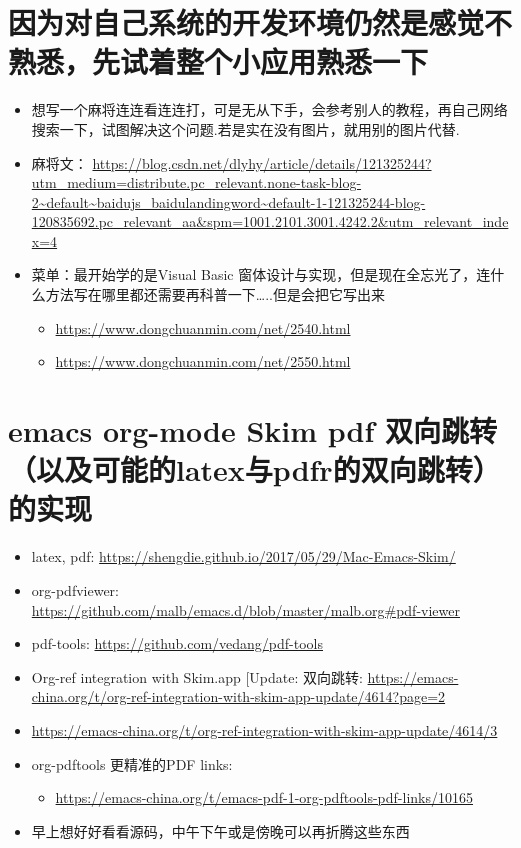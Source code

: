 \documentclass[9pt, b5paper]{article}
\begin{document}
\section{因为对自己系统的开发环境仍然是感觉不熟悉，先试着整个小应用熟悉一下}
\label{sec-9}
\begin{itemize}
\item 想写一个麻将连连看连连打，可是无从下手，会参考别人的教程，再自己网络搜索一下，试图解决这个问题.若是实在没有图片，就用别的图片代替.
\item 麻将文： \url{https://blog.csdn.net/dlyhy/article/details/121325244?utm_medium=distribute.pc_relevant.none-task-blog-2~default~baidujs_baidulandingword~default-1-121325244-blog-120835692.pc_relevant_aa&spm=1001.2101.3001.4242.2&utm_relevant_index=4}
\item 菜单：最开始学的是Visual Basic 窗体设计与实现，但是现在全忘光了，连什么方法写在哪里都还需要再科普一下\ldots{}..但是会把它写出来
\begin{itemize}
\item \url{https://www.dongchuanmin.com/net/2540.html}
\item \url{https://www.dongchuanmin.com/net/2550.html}
\end{itemize}
\end{itemize}
\section{{\bfseries\sffamily emacs} org-mode Skim pdf 双向跳转（以及可能的latex与pdfr的双向跳转）的实现}
\label{sec-10}
\begin{itemize}
\item latex, pdf: \url{https://shengdie.github.io/2017/05/29/Mac-Emacs-Skim/}
\item org-pdfviewer: \url{https://github.com/malb/emacs.d/blob/master/malb.org#pdf-viewer}
\item pdf-tools: \url{https://github.com/vedang/pdf-tools}
\item Org-ref integration with Skim.app [Update: 双向跳转: \url{https://emacs-china.org/t/org-ref-integration-with-skim-app-update/4614?page=2}
\item \url{https://emacs-china.org/t/org-ref-integration-with-skim-app-update/4614/3}
\item{} org-pdftools 更精准的PDF links: 
\begin{itemize}
\item \url{https://emacs-china.org/t/emacs-pdf-1-org-pdftools-pdf-links/10165}
\end{itemize}
\item 早上想好好看看源码，中午下午或是傍晚可以再折腾这些东西
\end{itemize}
\end{document}
